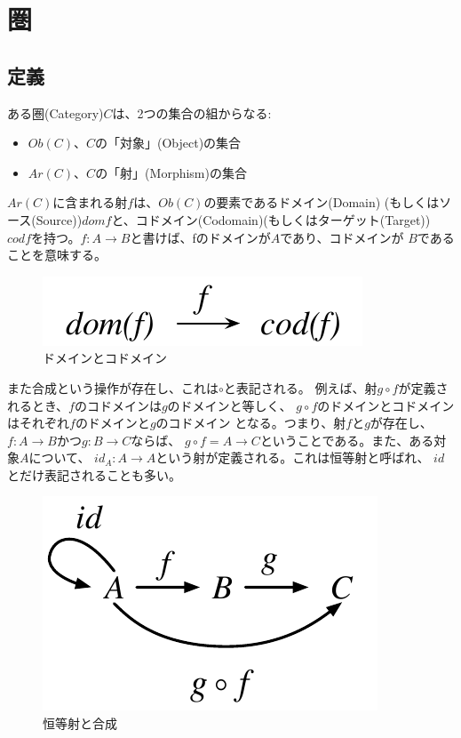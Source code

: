 
\section{圏}

\subsection{定義}
ある圏(Category)$C$は、2つの集合の組からなる:

\begin{itemize}
    \item $Ob(C)$、$C$の「対象」(Object)の集合
    \item $Ar(C)$、$C$の「射」(Morphism)の集合
\end{itemize}

$Ar(C)$に含まれる射$f$は、$Ob(C)$の要素であるドメイン(Domain)
(もしくはソース(Source))$dom f$と、コドメイン(Codomain)(もしくはターゲット(Target))
$cod f$を持つ。$f:A \to B$と書けば、fのドメインが$A$であり、コドメインが
$B$であることを意味する。

\begin{figure}[htbp]
    \centering
    \includegraphics{diag_dom.pdf}
    \caption{ドメインとコドメイン}
\end{figure}

また合成という操作が存在し、これは$\circ$と表記される。
例えば、射$g \circ f$が定義されるとき、$f$のコドメインは$g$のドメインと等しく、
$g \circ f$のドメインとコドメインはそれぞれ$f$のドメインと$g$のコドメイン
となる。つまり、射$f$と$g$が存在し、$f:A \to B$かつ$g:B \to C$ならば、
$g \circ f = A \to C$ということである。また、ある対象$A$について、
$id_A: A \to A$という射が定義される。これは恒等射と呼ばれ、
$id$とだけ表記されることも多い。

\begin{figure}[htbp]
    \centering
    \includegraphics{diag_comp.pdf}
    \caption{恒等射と合成}
\end{figure}

